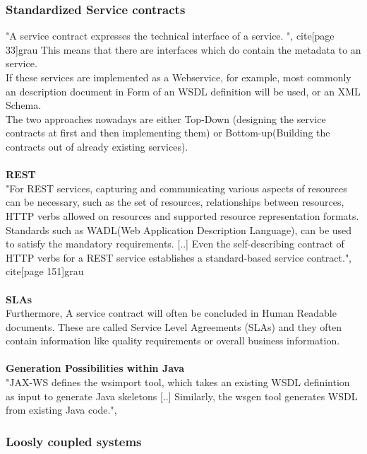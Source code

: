\documentclass[12pt]{article}
\begin{document}
\subsubsection{Standardized Service contracts}
"A service contract expresses the technical interface of a service. ", cite[page 33]{grau} This means that there are interfaces which do contain the metadata to an service.  \\ If these services are implemented as a Webservice, for example, most commonly an description document in Form of an WSDL definition will be used, or an XML Schema. \\
The two approaches nowadays are either Top-Down (designing the service contracts at first and then implementing them) or Bottom-up(Building the contracts out of already existing services). \cite[page 151,152]{grau}
\\ \\
\textbf{REST}\\
"For REST services, capturing and communicating various aspects of resources can be necessary, such as the set of resources, relationships between resources, HTTP verbs allowed on resources and supported resource representation formats. Standards such as WADL(Web Application Description Language), can be used to satisfy the mandatory requirements. [..] Even the self-describing contract of HTTP verbs for a REST service establishes a standard-based service contract.", cite[page 151]{grau}
\\ \\
\textbf{SLAs} \\
Furthermore, A service contract will often be concluded in Human Readable documents. These are called Service Level Agreements (SLAs) and they often contain information like quality requirements or overall business information. %
\\ \\
\textbf{Generation Possibilities within Java} \\
"JAX-WS defines the wsimport tool, which takes an existing WSDL definintion as input to generate Java skeletons [..] Similarly, the wsgen tool generates WSDL from existing Java code.",\cite[page 151]{grau}
\\
\subsubsection{Loosly coupled systems}
\end{document}
